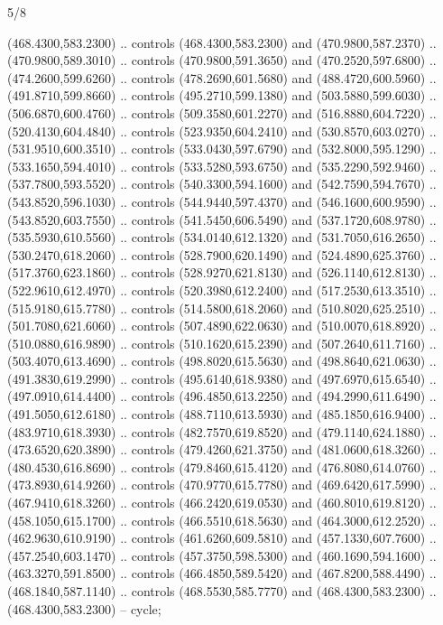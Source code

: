 \begin{flagdescription}{5/8}
\begin{scope}[shift={(m)}]
\begin{scope}[scale=\flagwidth/220,y=0.1mm, x=0.1mm, yscale=-1,shift={(-596,-360)}]
\begin{scope}[cm={{-1.0,0.0,0.0,1.0,(1193.9797,0.0)}}]
\begin{scope}[draw=black,line join=round,line cap=round,line width=0.381\lw]
\begin{scope}[line width=0.534\lw,fill=green]
 (468.4300,583.2300) .. controls (468.4300,583.2300) and
  (470.9800,587.2370) .. (470.9800,589.3010) .. controls (470.9800,591.3650) and
  (470.2520,597.6800) .. (474.2600,599.6260) .. controls (478.2690,601.5680) and
  (488.4720,600.5960) .. (491.8710,599.8660) .. controls (495.2710,599.1380) and
  (503.5880,599.6030) .. (506.6870,600.4760) .. controls (509.3580,601.2270) and
  (516.8880,604.7220) .. (520.4130,604.4840) .. controls (523.9350,604.2410) and
  (530.8570,603.0270) .. (531.9510,600.3510) .. controls (533.0430,597.6790) and
  (532.8000,595.1290) .. (533.1650,594.4010) .. controls (533.5280,593.6750) and
  (535.2290,592.9460) .. (537.7800,593.5520) .. controls (540.3300,594.1600) and
  (542.7590,594.7670) .. (543.8520,596.1030) .. controls (544.9440,597.4370) and
  (546.1600,600.9590) .. (543.8520,603.7550) .. controls (541.5450,606.5490) and
  (537.1720,608.9780) .. (535.5930,610.5560) .. controls (534.0140,612.1320) and
  (531.7050,616.2650) .. (530.2470,618.2060) .. controls (528.7900,620.1490) and
  (524.4890,625.3760) .. (517.3760,623.1860) .. controls (528.9270,621.8130) and
  (526.1140,612.8130) .. (522.9610,612.4970) .. controls (520.3980,612.2400) and
  (517.2530,613.3510) .. (515.9180,615.7780) .. controls (514.5800,618.2060) and
  (510.8020,625.2510) .. (501.7080,621.6060) .. controls (507.4890,622.0630) and
  (510.0070,618.8920) .. (510.0880,616.9890) .. controls (510.1620,615.2390) and
  (507.2640,611.7160) .. (503.4070,613.4690) .. controls (498.8020,615.5630) and
  (498.8640,621.0630) .. (491.3830,619.2990) .. controls (495.6140,618.9380) and
  (497.6970,615.6540) .. (497.0910,614.4400) .. controls (496.4850,613.2250) and
  (494.2990,611.6490) .. (491.5050,612.6180) .. controls (488.7110,613.5930) and
  (485.1850,616.9400) .. (483.9710,618.3930) .. controls (482.7570,619.8520) and
  (479.1140,624.1880) .. (473.6520,620.3890) .. controls (479.4260,621.3750) and
  (481.0600,618.3260) .. (480.4530,616.8690) .. controls (479.8460,615.4120) and
  (476.8080,614.0760) .. (473.8930,614.9260) .. controls (470.9770,615.7780) and
  (469.6420,617.5990) .. (467.9410,618.3260) .. controls (466.2420,619.0530) and
  (460.8010,619.8120) .. (458.1050,615.1700) .. controls (466.5510,618.5630) and
  (464.3000,612.2520) .. (462.9630,610.9190) .. controls (461.6260,609.5810) and
  (457.1330,607.7600) .. (457.2540,603.1470) .. controls (457.3750,598.5300) and
  (460.1690,594.1600) .. (463.3270,591.8500) .. controls (466.4850,589.5420) and
  (467.8200,588.4490) .. (468.1840,587.1140) .. controls (468.5530,585.7770) and
  (468.4300,583.2300) .. (468.4300,583.2300) -- cycle;


\end{scope}
\end{scope}
\end{scope}
\end{scope}
\end{scope}
\end{flagdescription}
